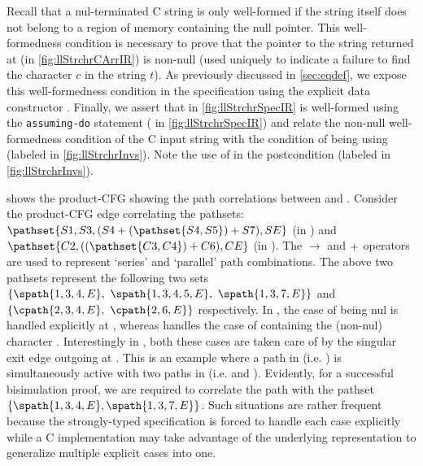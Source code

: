 Recall that a nul-terminated C string is only well-formed if the string itself does not belong to a region of memory containing the null pointer.
This well-formedness condition is necessary to prove that the pointer to the string returned at  (in \cref{fig:llStrchrCArrIR})
is non-null (used uniquely to indicate a failure to find the character $c$ in the string $t$).
As previously discussed in \cref{sec:eqdef}, we expose this well-formedness condition in the specification using
the explicit  data constructor .
Finally, we assert that  in \cref{fig:llStrchrSpecIR} is well-formed using the {\tt assuming-do} statement
( in \cref{fig:llStrchrSpecIR}) and relate the non-null well-formedness condition of the C input string 
with the condition of  being  using \pre{} (labeled  in \cref{fig:llStrchrInvs}).
Note the use of  in the postcondition (labeled  in \cref{fig:llStrchrInvs}).

 shows the product-CFG showing the path correlations between \sprog{} and \cprog{}.
Consider the product-CFG edge  correlating the pathsets:
{\small $\pathset{S1,S3,(S4 \pathpar (\pathset{S4,S5}) \pathpar S7), SE}$} (in \sprog{}) and
{\small $\pathset{C2,((\pathset{C3,C4}) \pathpar C6),CE}$} (in \cprog{}).
The $\rightarrow$ and $+$ operators are used to represent `series' and `parallel' path combinations.
The above two pathsets represent the following two sets
{\small $\{ \spath{1,3,4,E},\ \spath{1,3,4,5,E},\ \spath{1,3,7,E} \}$} and
{\small $\{ \cpath{2,3,4,E},\ \cpath{2,6,E} \}$} respectively.
In \sprog{}, the case of  being nul is handled explicitly at , whereas
 handles the case of  containing the (non-nul) character .
Interestingly in \cprog{}, both these cases are taken care of by the singular exit edge outgoing at .
This is an example where a path in \cprog{} (i.e. ) is simultaneously active with
two paths in \sprog{} (i.e.  and ).
Evidently, for a successful bisimulation proof, we are required to correlate the \cprog{} path
 with the \sprog{} pathset $\{ \spath{1,3,4,E}, \spath{1,3,7,E} \}$.
Such situations are rather frequent because the strongly-typed specification is forced to handle
each case explicitly while a C implementation may take advantage of the
underlying representation to generalize multiple explicit cases into one.

